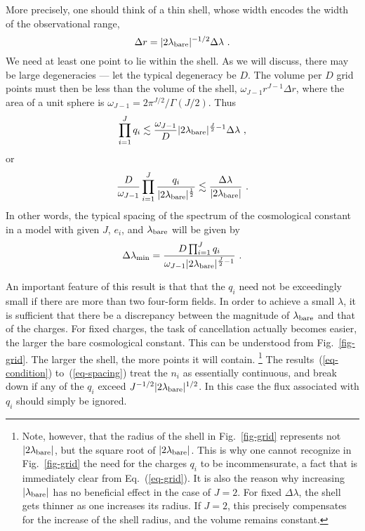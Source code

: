 \documentclass[12pt]{article}
\begin{document}
More precisely, one should think of a thin shell, whose width encodes
the width of the observational range,
\begin{equation}
\Delta r = |2\lambda_{\rm bare}|^{-1/2} \Delta\lambda\ .
\end{equation}
We need at least one point to lie within the shell.  As we will
discuss, there may be large degeneracies --- let the typical
degeneracy be $D$. The volume per $D$ grid points must then be less
than the volume of the shell, $\omega_{J-1} r^{J-1} \Delta r$, where
the area of a unit sphere is $\omega_{J-1} = 2 \pi^{J/2} /
\Gamma(J/2)$.  Thus
\begin{equation}
\prod_{i=1}^J q_i \lesssim \frac{\omega_{J-1}}{D}|2 \lambda_{\rm
bare}|^{\frac{J}{2}-1} \Delta\lambda\ ,
\label{eq-condition}
\end{equation}
or
\begin{equation}
\frac{D}{\omega_{J-1}}
\prod_{i=1}^J \frac{q_i}{|2 \lambda_{\rm
bare}|^{\frac{1}{2}}}
\lesssim
\frac{\Delta\lambda_{}}{|2 \lambda_{\rm
bare}|}
\ .
\label{eq-condition2}
\end{equation}
In other words, the typical spacing of the spectrum of the
cosmological constant in a model with given $J$, $e_i$, and
$\lambda_{\rm bare}$ will be given by
\begin{equation}
{\Delta\lambda_{\rm min}} =
\frac{D \prod_{i=1}^J {q_i}}
{{\omega_{J-1}} |2 \lambda_{\rm
bare}|^{\frac{J}{2}-1}}\ .
\label{eq-spacing}
\end{equation}

An important feature of this result is that that the $q_i$ need not be
exceedingly small if there are more than two four-form fields.  In
order to achieve a small $\lambda$, it is sufficient that there be a
discrepancy between the magnitude of $\lambda_{\rm bare}$ and that of
the charges.  For fixed charges, the task of cancellation actually
becomes easier, the larger the bare cosmological constant.  This can
be understood from Fig.~\ref{fig-grid}.  The larger the shell, the
more points it will contain.%
%
\footnote{Note, however, that the radius of the shell in
Fig.~\ref{fig-grid} represents not $|2\lambda_{\rm bare}|$, but the
square root of $|2\lambda_{\rm bare}|$.  This is why one cannot
recognize in Fig.~\ref{fig-grid} the need for the charges $q_i$ to be
incommensurate, a fact that is immediately clear from
Eq.~(\ref{eq-grid}).  It is also the reason why increasing
$|\lambda_{\rm bare}|$ has no beneficial effect in the case of $J=2$.
For fixed $\Delta\lambda$, the shell gets thinner as one increases its
radius.  If $J=2$, this precisely compensates for the increase of the
shell radius, and the volume remains constant.} %
%
The results~(\ref{eq-condition}) to~(\ref{eq-spacing}) treat the $n_i$
as essentially continuous, and break down if any of the $q_i$ exceed
$J^{-1/2} |2 \lambda_{\rm bare}|^{1/2}$.  In this case the flux
associated with $q_i$ should simply be ignored.
\end{document}
